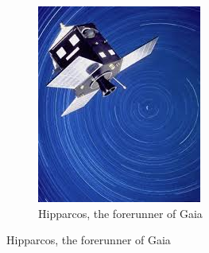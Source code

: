\documentclass{beamer}
\begin{document}
\begin{frame}
\begin{itemize}
\begin{figure}[h!]
\begin{subfigure}[b]{0.2\linewidth}
    \includegraphics[width=1\linewidth]{hippSatIm}
     \caption{Hipparcos, the forerunner of Gaia}
  \end{subfigure}
\end{figure}

\end{itemize}
\end{frame}
\end{document}
